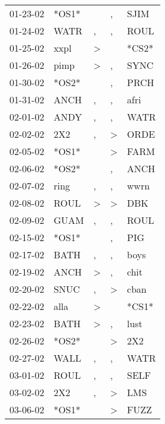\begin{supertabular}{lllll}
 01-23-02 &  *OS1* &                  &                , &   SJIM \\
 01-24-02 &   WATR &                , &                , &   ROUL \\
 01-25-02 &   xxpl &     \textgreater &                  &  *CS2* \\
 01-26-02 &   pimp &     \textgreater &                , &   SYNC \\
 01-30-02 &  *OS2* &                  &                , &   PRCH \\
 01-31-02 &   ANCH &                , &                , &   afri \\
 02-01-02 &   ANDY &                , &                , &   WATR \\
 02-02-02 &    2X2 &                , &     \textgreater &   ORDE \\
 02-05-02 &  *OS1* &                  &     \textgreater &   FARM \\
 02-06-02 &  *OS2* &                  &                , &   ANCH \\
 02-07-02 &   ring &                , &                , &   wwrn \\
 02-08-02 &   ROUL &     \textgreater &     \textgreater &    DBK \\
 02-09-02 &   GUAM &                , &                , &   ROUL \\
 02-15-02 &  *OS1* &                  &                , &    PIG \\
 02-17-02 &   BATH &                , &                , &   boys \\
 02-19-02 &   ANCH &     \textgreater &                , &   chit \\
 02-20-02 &   SNUC &                , &     \textgreater &   cban \\
 02-22-02 &   alla &     \textgreater &                  &  *CS1* \\
 02-23-02 &   BATH &     \textgreater &                , &   lust \\
 02-26-02 &  *OS2* &                  &     \textgreater &    2X2 \\
 02-27-02 &   WALL &                , &                , &   WATR \\
 03-01-02 &   ROUL &                , &                , &   SELF \\
 03-02-02 &    2X2 &                , &     \textgreater &    LMS \\
 03-06-02 &  *OS1* &                  &     \textgreater &   FUZZ \\

\end{supertabular}
